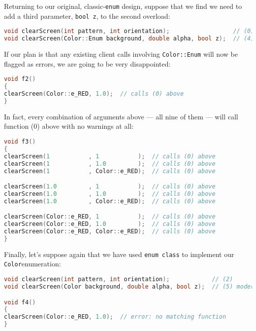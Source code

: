 \noindent Returning to our original, classic-\texttt{enum} design, suppose that we
find we need to add a third parameter, \texttt{bool}~\texttt{z}, to the
second overload:

\begin{lstlisting}[language=C++]
void clearScreen(int pattern, int orientation);                  // (0)
void clearScreen(Color::Enum background, double alpha, bool z);  // (4) classic
\end{lstlisting}

\noindent If our plan is that any existing client calls involving
\texttt{Color::Enum} will now be flagged as errors, we are going to be
very disappointed:

\begin{lstlisting}[language=C++]
void f2()
{
clearScreen(Color::e_RED, 1.0);  // calls (0) above
}
\end{lstlisting}

\noindent In fact, every combination of arguments above --- all nine of them ---
will call function (0) above with no warnings at all:

\begin{lstlisting}[language=C++]
void f3()
{
clearScreen(1           , 1           );  // calls (0) above
clearScreen(1           , 1.0         );  // calls (0) above
clearScreen(1           , Color::e_RED);  // calls (0) above

clearScreen(1.0         , 1           );  // calls (0) above
clearScreen(1.0         , 1.0         );  // calls (0) above
clearScreen(1.0         , Color::e_RED);  // calls (0) above

clearScreen(Color::e_RED, 1           );  // calls (0) above
clearScreen(Color::e_RED, 1.0         );  // calls (0) above
clearScreen(Color::e_RED, Color::e_RED);  // calls (0) above
}
\end{lstlisting}

\noindent Finally, let's suppose again that we have used
\texttt{enum}~\texttt{class} to implement our \texttt{Color}\linebreak[4]
\mbox{enumeration}:

\begin{lstlisting}[language=C++]
void clearScreen(int pattern, int orientation);            // (2)
void clearScreen(Color background, double alpha, bool z);  // (5) modern

void f4()
{
clearScreen(Color::e_RED, 1.0);  // error: no matching function
}
\end{lstlisting}

